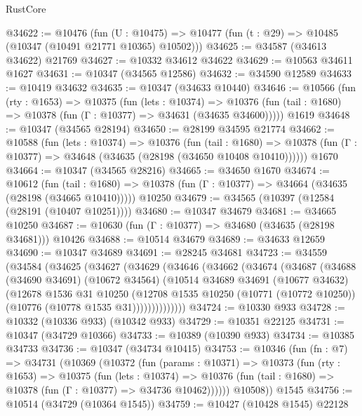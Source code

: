 \begin{lexlean}{RustCore}
\begin{coremodule}
@34622 := @10476
    (fun (U : @10475) => @10477 (fun (t : @29) => @10485 (@10347 (@10491 @21771 @10365) @10502)))
@34625 := @34587 (@34613 @34622) @21769
@34627 := @10332 @34612 @34622
@34629 := @10563 @34611 @1627
@34631 := @10347 (@34565 @12586)
@34632 := @34590 @12589
@34633 := @10419 @34632
@34635 := @10347 (@34633 @10440)
@34646 := @10566
    (fun (rty : @1653) =>
    @10375
      (fun (lets : @10374) =>
      @10376 (fun (tail : @1680) => @10378 (fun (Γ : @10377) => @34631 (@34635 @34600)))))
    @1619
@34648 := @10347 (@34565 @28194)
@34650 := @28199 @34595 @21774
@34662 := @10588
    (fun (lets : @10374) =>
    @10376
      (fun (tail : @1680) =>
      @10378 (fun (Γ : @10377) => @34648 (@34635 (@28198 (@34650 @10408 @10410))))))
    @1670
@34664 := @10347 (@34565 @28216)
@34665 := @34650 @1670
@34674 := @10612
    (fun (tail : @1680) => @10378 (fun (Γ : @10377) => @34664 (@34635 (@28198 (@34665 @10410)))))
    @10250
@34679 := @34565 (@10397 (@12584 (@28191 (@10407 @10251))))
@34680 := @10347 @34679
@34681 := @34665 @10250
@34687 := @10630 (fun (Γ : @10377) => @34680 (@34635 (@28198 @34681))) @10426
@34688 := @10514 @34679
@34689 := @34633 @12659
@34690 := @10347 @34689
@34691 := @28245 @34681
@34723 := @34559
    (@34584
      (@34625
        (@34627
          (@34629
            (@34646
              (@34662
                (@34674
                  (@34687
                    (@34688
                      (@34690 @34691)
                      (@10672 @34564)
                      (@10514
                        @34689
                        @34691
                        (@10677 @34632)
                        (@12678
                          @1536
                          @31
                          @10250
                          (@12708
                            @1535
                            @10250
                            (@10771 (@10772 @10250))
                            (@10776 (@10778 @1535 @31))))))))))))))
@34724 := @10330 @933
@34728 := @10332 (@10336 @933) (@10342 @933)
@34729 := @10351 @22125
@34731 := @10347 (@34729 @10366)
@34733 := @10389 (@10390 @933)
@34734 := @10385 @34733
@34736 := @10347 (@34734 @10415)
@34753 := @10346
    (fun (fn : @7) =>
    @34731
      (@10369
        (@10372
          (fun (params : @10371) =>
          @10373
            (fun (rty : @1653) =>
            @10375
              (fun (lets : @10374) =>
              @10376 (fun (tail : @1680) => @10378 (fun (Γ : @10377) => @34736 @10462))))))
        @10508))
    @1545
@34756 := @10514 (@34729 (@10364 @1545))
@34759 := @10427 (@10428 @1545) @22128

\end{coremodule}
\end{lexlean}
